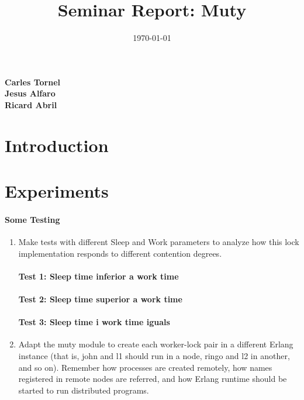 \documentclass[a4paper, 10pt]{article}
\title{Seminar Report: Muty}
\date{\normalsize\today{}}
\begin{document}
\maketitle

\begin{center}
  \textbf{Carles Tornel}\\
  \textbf{Jesus Alfaro}\\
  \textbf{Ricard Abril}

\end{center}

\section{Introduction}

\newpage
\section{Experiments}
\paragraph[bold]{Some Testing}
\begin{enumerate}
\item Make tests with different Sleep and Work parameters to analyze how this lock implementation responds to different contention degrees.
\paragraph[bold]{Test 1: Sleep time inferior a work time}
\paragraph[bold]{Test 2: Sleep time superior a work time}
\paragraph[bold]{Test 3: Sleep time i work time iguals}
\item Adapt the muty module to create each worker-lock pair in a different Erlang instance (that is, john and l1 should run in a node, ringo and l2 in another, and so on). Remember how processes are created remotely, how names registered in remote nodes are referred, and how Erlang runtime should be started to run distributed programs.  
\end{enumerate}
\end{document}
